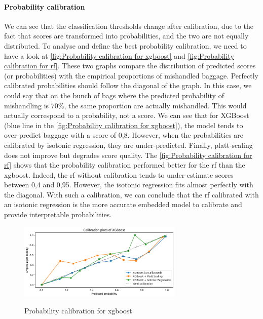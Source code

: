 \documentclass[12pt]{article}
\begin{document}
\paragraph{Probability calibration} We can see that the classification thresholds change after calibration, due to the fact that scores are transformed into probabilities, and the two are not equally distributed. To analyse and define the best probability calibration, we need to have a look at \autoref{fig:Probability calibration for xgboost} and \autoref{fig:Probability calibration for rf}. 
These two graphs compare the distribution of predicted scores (or probabilities) with the empirical proportions of mishandled baggage. Perfectly calibrated probabilities should follow the diagonal of the graph. In this case, we could say that on the bunch of bags where the predicted probability of mishandling is 70\%, the same proportion are actually mishandled. This would actually correspond to a probability, not a score. 
We can see that for XGBoost (blue line in the \autoref{fig:Probability calibration for xgboost}), the model tends to over-predict baggage with a score of 0,8. However, when the probabilities are calibrated by isotonic regression, they are under-predicted. Finally, platt-scaling does not improve but degrades score quality.
The \autoref{fig:Probability calibration for rf} shows that the probability calibration performed better for the \acrshort{rf} than the \acrshort{xgboost}. Indeed, the \acrshort{rf} without calibration tends to under-estimate scores between 0,4 and 0,95. However, the isotonic regression fits almost perfectly with the diagonal. With such a calibration, we can conclude that the \acrshort{rf} calibrated with an isotonic regression is the more accurate embedded model to calibrate and provide interpretable probabilities.


\FloatBarrier
\begin{figure}[h]
    \centering
    \includegraphics[width=0.7\textwidth]{Calibration_plot_XGBOOST.png}\\
    \caption{Probability calibration for \acrshort{xgboost}}
    \label{fig:Probability calibration for xgboost}
\end{figure}
\FloatBarrier
\end{document}
